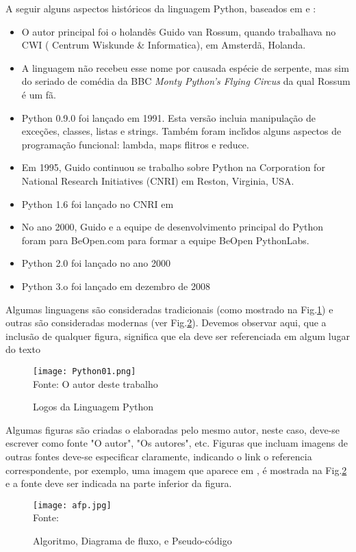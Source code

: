 A seguir alguns aspectos históricos da linguagem Python, baseados em\cite{Perkovic2016} e \cite{Borges2014} :
\begin{itemize}
  \item O autor principal foi o holand\^{e}s Guido van Rossum, quando trabalhava no CWI ( Centrum Wiskunde \& Informatica), em Amsterd\~{a}, Holanda.
  \item  A linguagem n\~{a}o recebeu esse nome por causada esp\'{e}cie de serpente, mas sim do seriado de com\'{e}dia da BBC \textit{Monty Python's Flying Circus} da qual Rossum \'{e} um f\~{a}.
  \item Python 0.9.0 foi lan\c{c}ado em 1991.  Esta vers\~{a}o incluia manipula\c{c}\~{a}o de exce\c{c}\~{o}es, classes, listas e strings. Tamb\'{e}m foram incl\'{\i}dos alguns aspectos de programa\c{c}\~{a}o funcional: lambda, maps flitros e reduce.
  \item  Em 1995, Guido continuou se trabalho sobre Python na Corporation for National Research Initiatives (CNRI) em Reston, Virginia, USA.
  \item Python 1.6 foi lan\c{c}ado no CNRI em
  \item  No ano 2000, Guido e a equipe de desenvolvimento principal do Python foram para BeOpen.com para formar a equipe BeOpen PythonLabs.
  \item Python 2.0 foi lan\c{c}ado no ano 2000
  \item Python 3.o foi lan\c{c}ado em dezembro de 2008
\end{itemize}

Algumas linguagens s\~{a}o consideradas  tradicionais (como mostrado na Fig.\ref{ling1}) e outras s\~{a}o consideradas modernas (ver Fig.\ref{afp}). Devemos observar aqui, que a inclus\~{a}o de qualquer figura, significa que ela deve ser referenciada em algum lugar do texto
   \begin{figure}[H]
    \begin{center}
        \caption{Logos da Linguagem Python} \label{ling1}
        \texttt{[image: Python01.png]} \\
        {\tiny \sf Fonte: O autor deste trabalho }
    \end{center}
   \end{figure}

Algumas figuras s\~{a}o criadas o elaboradas pelo mesmo autor, neste caso, deve-se escrever como fonte "O autor", "Os autores", etc. Figuras que incluam imagens de outras fontes deve-se especificar claramente, indicando o link o referencia correspondente, por exemplo, uma imagem que aparece em \cite[p. 93]{Sprankle2012}, \'{e} mostrada na Fig.\ref{afp} e a fonte deve ser indicada na parte inferior da figura.
   \begin{figure}[H]
    \begin{center}
        \caption{Algoritmo, Diagrama de fluxo, e Pseudo-c\'{o}digo} \label{afp}
        \texttt{[image: afp.jpg]} \\
        {\tiny \sf Fonte: \cite[p. 93]{Sprankle2012} }
    \end{center}
   \end{figure}

